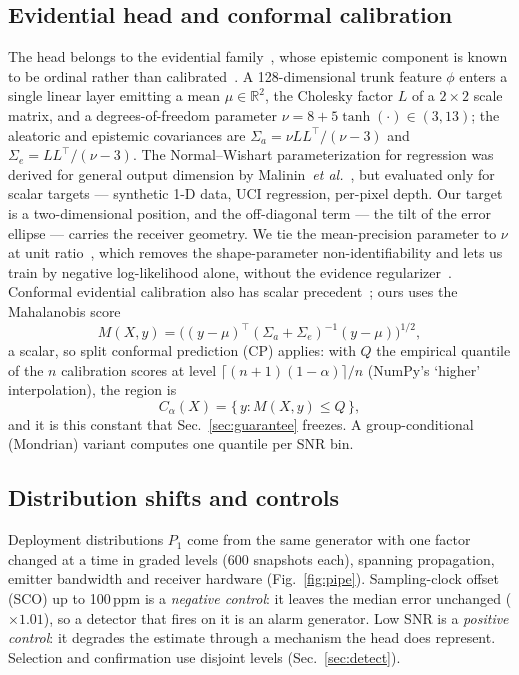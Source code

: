 \documentclass{article}
\def\x{\times}
\newcommand{\etal}{\textit{et al.}}
\begin{document}
\subsection{Evidential head and conformal calibration}
\label{sec:uq}
The head belongs to the evidential family~\cite{amini2020}, whose epistemic component
is known to be ordinal rather than calibrated~\cite{juergens2024}.
A 128-dimensional trunk feature $\phi$ enters a single linear layer
emitting a mean $\mu\in\mathbb{R}^2$, the Cholesky factor $L$ of a $2\x2$
scale matrix, and a degrees-of-freedom parameter
$\nu = 8+5\tanh(\cdot)\in(3,13)$; the aleatoric and epistemic covariances
are $\Sigma_a=\nu LL^{\!\top}\!/(\nu-3)$ and
$\Sigma_e=LL^{\!\top}\!/(\nu-3)$. The Normal--Wishart parameterization for
regression was derived for general output dimension by
Malinin~\etal~\cite{malinin2020}, but evaluated only for scalar targets ---
synthetic 1-D data, UCI regression, per-pixel depth. Our target is a
two-dimensional position, and the off-diagonal term --- the tilt of the
error ellipse --- carries the receiver geometry. We tie
the mean-precision parameter to $\nu$ at unit ratio~\cite{meinert2021}, which
removes the shape-parameter non-identifiability and lets us train by negative log-likelihood alone,
without the evidence regularizer~\cite{malinin2020}. Conformal evidential calibration also has scalar
precedent~\cite{duan2025}; ours
uses the Mahalanobis score
\begin{equation}
M(X,y)=\big((y-\mu)^{\!\top}(\Sigma_a{+}\Sigma_e)^{-1}(y-\mu)\big)^{1/2},
\label{eq:maha}
\end{equation}
a scalar, so split conformal prediction (CP) applies: with $Q$ the empirical quantile
of the $n$ calibration scores at level
$\lceil(n{+}1)(1{-}\alpha)\rceil/n$ (NumPy's `higher'
interpolation), the region is
\begin{equation}
C_\alpha(X)=\{\,y : M(X,y)\le Q\,\},
\label{eq:region}
\end{equation}
and it is this constant that Sec.~\ref{sec:guarantee} freezes. A
group-conditional (Mondrian) variant computes one quantile per SNR bin.

\subsection{Distribution shifts and controls}
\label{sec:axes}
Deployment distributions $P_1$ come from the same generator with one factor
changed at a time in graded levels (600 snapshots each), spanning
propagation, emitter bandwidth and receiver hardware
(Fig.~\ref{fig:pipe}). Sampling-clock offset (SCO) up to 100\,ppm is a \emph{negative control}: it
leaves the median error unchanged ($\x1.01$), so a detector that fires on
it is an alarm generator. Low SNR is a \emph{positive control}: it degrades
the estimate through a mechanism the head does represent. Selection and
confirmation use disjoint levels (Sec.~\ref{sec:detect}).
\end{document}
